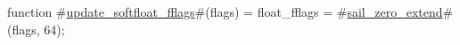 function #\hyperref[sailRISCVzupdatezysoftfloatzyfflags]{update\_softfloat\_fflags}#(flags) = {
  float_fflags = #\hyperref[sailRISCVzsailzyzzerozyextend]{sail\_zero\_extend}#(flags, 64);
}
